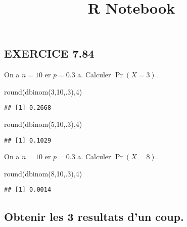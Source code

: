 \documentclass[
]{article}
\title{R Notebook}
\author{}
\date{\vspace{-2.5em}}
\newenvironment{Shaded}{\begin{snugshade}}{\end{snugshade}}
\newcommand{\DecValTok}[1]{\textcolor[rgb]{0.00,0.00,0.81}{#1}}
\newcommand{\FunctionTok}[1]{\textcolor[rgb]{0.00,0.00,0.00}{#1}}
\newcommand{\NormalTok}[1]{#1}
\begin{document}
\maketitle

\hypertarget{exercice-7.84}{%
\subsection{EXERCICE 7.84}\label{exercice-7.84}}

On a \(n=10\) er \(p=0.3\) a. Calculer \(\Pr(X=3)\).

\begin{Shaded}
\begin{Highlighting}[]
\FunctionTok{round}\NormalTok{(}\FunctionTok{dbinom}\NormalTok{(}\DecValTok{3}\NormalTok{,}\DecValTok{10}\NormalTok{,.}\DecValTok{3}\NormalTok{),}\DecValTok{4}\NormalTok{)}
\end{Highlighting}
\end{Shaded}

\begin{verbatim}
## [1] 0.2668
\end{verbatim}

\begin{Shaded}
\begin{Highlighting}[]
\FunctionTok{round}\NormalTok{(}\FunctionTok{dbinom}\NormalTok{(}\DecValTok{5}\NormalTok{,}\DecValTok{10}\NormalTok{,.}\DecValTok{3}\NormalTok{),}\DecValTok{4}\NormalTok{)}
\end{Highlighting}
\end{Shaded}

\begin{verbatim}
## [1] 0.1029
\end{verbatim}

On a \(n=10\) er \(p=0.3\) a. Calculer \(\Pr(X=8)\).

\begin{Shaded}
\begin{Highlighting}[]
\FunctionTok{round}\NormalTok{(}\FunctionTok{dbinom}\NormalTok{(}\DecValTok{8}\NormalTok{,}\DecValTok{10}\NormalTok{,.}\DecValTok{3}\NormalTok{),}\DecValTok{4}\NormalTok{)}
\end{Highlighting}
\end{Shaded}

\begin{verbatim}
## [1] 0.0014
\end{verbatim}

\hypertarget{obtenir-les-3-resultats-dun-coup.}{%
\subsection{Obtenir les 3 resultats d'un
coup.}\label{obtenir-les-3-resultats-dun-coup.}}
\end{document}
